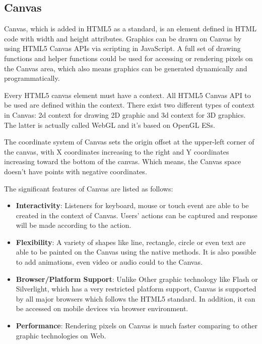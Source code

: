 







\subsection{Canvas}

Canvas, which is added in HTML5 as a standard, is an element defined in HTML code with width and height attributes. Graphics can be drawn on Canvas by using HTML5 Canvas APIs via scripting in JavaScript. A full set of drawing functions and helper functions could be used for accessing or rendering pixels on the Canvas area, which also means graphics can be generated dynamically and programmatically. 

Every HTML5 canvas element must have a context. All HTML5 Canvas API to be used are defined within the context. There exist two different types of context in Canvas: 2d context  for drawing 2D graphic and 3d context for 3D graphics. The latter is actually called WebGL and it’s based on OpenGL ESs\cite{williams2012learning}.

The coordinate system of Canvas sets the origin offset at the upper-left corner of the canvas, with X coordinates increasing to the right and Y coordinates increasing toward the bottom of the canvas. Which means, the Canvas space doesn’t have points with negative coordinates. 

The significant features of Canvas are listed as follows:

\begin{itemize}
  \item \textbf{Interactivity}: Listeners for keyboard, mouse or touch event are able to be created in the context of Canvas. Users' actions can be captured and response will be made according to the action. 
  \item \textbf{Flexibility}: A variety of shapes like line, rectangle, circle or even text are able to be painted on the Canvas using the native methods. It is also possible to add animations, even video or audio could to the Canvas\cite{geary2012core}.
  \item \textbf{Browser/Platform Support}: Unlike Other graphic technology like Flash or Silverlight, which has a very restricted platform support, Canvas is supported by all major browsers which follows the HTML5 standard. In addition, it can be accessed on mobile devices via browser environment.
  \item \textbf{Performance}: Rendering pixels on Canvas is much faster comparing to other graphic technologies on Web\cite{corcoran2011effective}.
\end{itemize}


